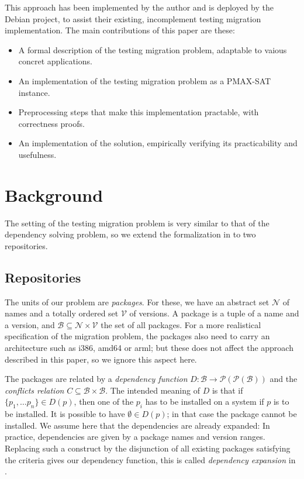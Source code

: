 \documentclass[halfparskip,11pt]{scrartcl}
\begin{document}
This approach has been implemented by the author and is deployed by the Debian project, to assist their existing, incomplement testing migration implementation. The main contributions of this paper are these:
\begin{itemize}
\item A formal description of the testing migration problem, adaptable to vaious concret applications.
\item An implementation of the testing migration problem as a PMAX-SAT instance.
\item Preprocessing steps that make this implementation practable, with correctness proofs.
\item An implementation of the solution, empirically verifying its practicability and usefulness.
\end{itemize}

\section{Background}

The setting of the testing migration problem is very similar to that of the dependency solving problem, so we extend the formalization in \cite{edos} to two repositories.

\subsection{Repositories}

The units of our problem are \emph{packages}. For these, we have an abstract set $\mathcal N$ of names and a totally ordered set $\mathcal V$ of versions. A package is a tuple of a name and a version, and $\mathcal B\subseteq \mathcal N \times \mathcal V$ the set of all packages. For a more realistical specification of the migration problem, the packages also need to carry an architecture such as i386, amd64 or arml; but these does not affect the approach described in this paper, so we ignore this aspect here.

The packages are related by a \emph{dependency function} $D \colon \mathcal B \to \mathcal P(\mathcal P(\mathcal B))$ and the \emph{conflicts relation} $C\subseteq \mathcal B \times \mathcal B$. The intended meaning of $D$ is that if $\{p_1,\ldots p_n\} \in D(p)$, then one of the $p_i$ has to be installed on a system if $p$ is to be installed. It is possible to have $\emptyset\in D(p)$; in that case the package cannot be installed. We assume here that the dependencies are already expanded: In practice, dependencies are given by a package names and version ranges. Replacing such a construct by the disjunction of all existing packages satisfying the criteria gives our dependency function, this is called \emph{dependency expansion} in \cite{edos}.
\end{document}

